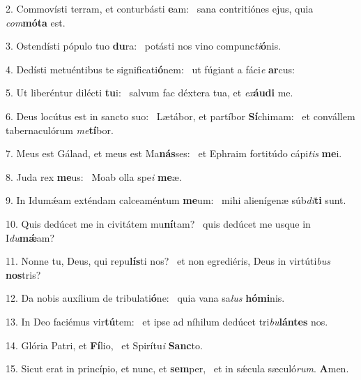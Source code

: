 2. Commovísti terram, et conturbásti \textbf{e}am: \ast\  sana contritiónes ejus, quia \textit{com}\textbf{mó}\textbf{ta} est.\

3. Ostendísti pópulo tuo \textbf{du}ra: \ast\  potásti nos vino compunc\textit{ti}\textbf{ó}nis.\

4. Dedísti metuéntibus te significati\textbf{ó}nem: \ast\  ut fúgiant a fáci\textit{e} \textbf{ar}cus:\

5. Ut liberéntur dilécti \textbf{tu}i: \ast\  salvum fac déxtera tua, et \textit{ex}\textbf{áu}\textbf{di} me.\

6. Deus locútus est in sancto suo: \dag\  Lætábor, et partíbor \textbf{Sí}chimam: \ast\  et convállem tabernaculórum \textit{me}\textbf{tí}bor.\

7. Meus est Gálaad, et meus est Ma\textbf{nás}ses: \ast\  et Ephraim fortitúdo cápi\textit{tis} \textbf{me}i.\

8. Juda rex \textbf{me}us: \ast\  Moab olla spe\textit{i} \textbf{me}æ.\

9. In Idumǽam exténdam calceaméntum \textbf{me}um: \ast\  mihi alienígenæ súb\textit{di}\textbf{ti} sunt.\

10. Quis dedúcet me in civitátem mu\textbf{ní}tam? \ast\  quis dedúcet me usque in I\textit{du}\textbf{mǽ}am?\

11. Nonne tu, Deus, qui repu\textbf{lís}ti nos? \ast\  et non egrediéris, Deus in virtúti\textit{bus} \textbf{nos}tris?\

12. Da nobis auxílium de tribulati\textbf{ó}ne: \ast\  quia vana sa\textit{lus} \textbf{hó}\textbf{mi}nis.\

13. In Deo faciémus vir\textbf{tú}tem: \ast\  et ipse ad níhilum dedúcet tri\textit{bu}\textbf{lán}\textbf{tes} nos.\

14. Glória Patri, et \textbf{Fí}lio, \ast\  et Spirítu\textit{i} \textbf{Sanc}to.\

15. Sicut erat in princípio, et nunc, et \textbf{sem}per, \ast\  et in sǽcula sæculó\textit{rum}. \textbf{A}men.\

